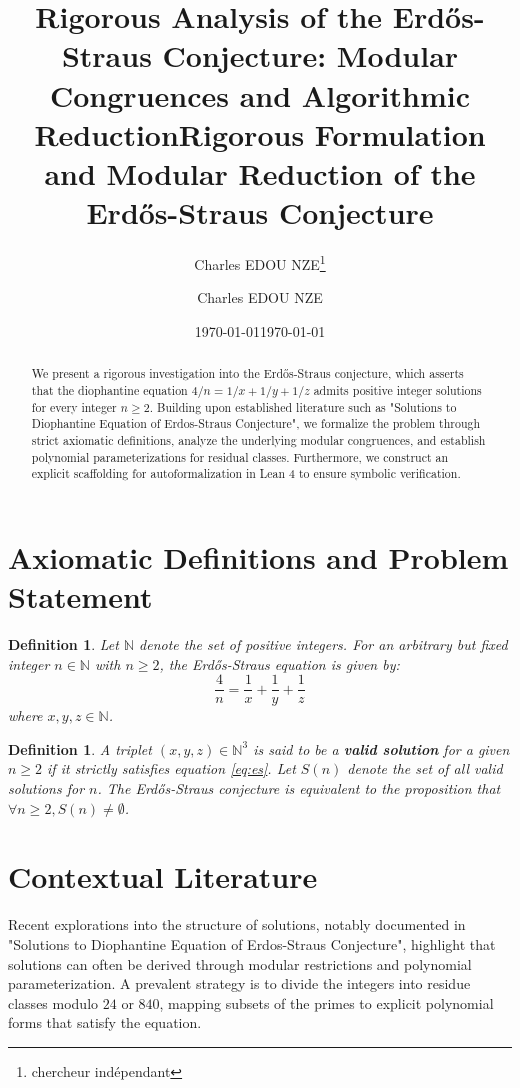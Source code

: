 \documentclass[12pt,a4paper]{article}
\title{Rigorous Analysis of the Erd\H{o}s-Straus Conjecture: Modular Congruences and Algorithmic Reduction}
\author{Charles EDOU NZE\thanks{chercheur ind\'ependant}}
\date{\today}
\title{Rigorous Formulation and Modular Reduction of the Erd\H{o}s-Straus Conjecture}
\author{Charles EDOU NZE}
\date{\today}
\newtheorem{definition}[theorem]{Definition}
\begin{document}
\maketitle

\begin{abstract}
We present a rigorous investigation into the Erd\H{o}s-Straus conjecture, which asserts that the diophantine equation $4/n = 1/x + 1/y + 1/z$ admits positive integer solutions for every integer $n \ge 2$. Building upon established literature such as "Solutions to Diophantine Equation of Erdos-Straus Conjecture", we formalize the problem through strict axiomatic definitions, analyze the underlying modular congruences, and establish polynomial parameterizations for residual classes. Furthermore, we construct an explicit scaffolding for autoformalization in Lean 4 to ensure symbolic verification.
\end{abstract}

\section{Axiomatic Definitions and Problem Statement}
\begin{definition}
Let $\mathbb{N}$ denote the set of positive integers. For an arbitrary but fixed integer $n \in \mathbb{N}$ with $n \ge 2$, the Erd\H{o}s-Straus equation is given by:
\begin{equation}
\frac{4}{n} = \frac{1}{x} + \frac{1}{y} + \frac{1}{z} \label{eq:es}
\end{equation}
where $x, y, z \in \mathbb{N}$.
\end{definition}
\begin{definition}
A triplet $(x, y, z) \in \mathbb{N}^3$ is said to be a \textbf{valid solution} for a given $n \ge 2$ if it strictly satisfies equation \eqref{eq:es}. Let $S(n)$ denote the set of all valid solutions for $n$. The Erd\H{o}s-Straus conjecture is equivalent to the proposition that $\forall n \ge 2, S(n) \neq \emptyset$.
\end{definition}

\section{Contextual Literature}
Recent explorations into the structure of solutions, notably documented in "Solutions to Diophantine Equation of Erdos-Straus Conjecture", highlight that solutions can often be derived through modular restrictions and polynomial parameterization. A prevalent strategy is to divide the integers into residue classes modulo $24$ or $840$, mapping subsets of the primes to explicit polynomial forms that satisfy the equation.
\end{document}
